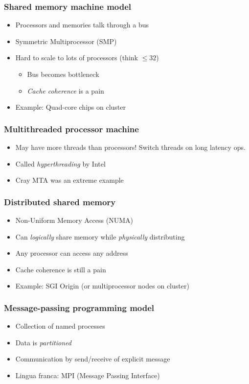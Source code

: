 \documentclass{beamer}
\begin{document}
\begin{frame}
  \frametitle{Shared memory machine model}

  \begin{itemize}
  \item Processors and memories talk through a bus
  \item Symmetric Multiprocessor (SMP)
  \item Hard to scale to lots of processors (think $\leq 32$)
    \begin{itemize}
      \item Bus becomes bottleneck
      \item {\em Cache coherence} is a pain
    \end{itemize}
  \item Example: Quad-core chips on cluster
  \end{itemize}
\end{frame}


\begin{frame}
  \frametitle{Multithreaded processor machine}
  
  \begin{itemize}
  \item May have more threads than processors!
    Switch threads on long latency ops.
  \item Called {\em hyperthreading} by Intel
  \item Cray MTA was an extreme example
  \end{itemize}
\end{frame}


\begin{frame}
  \frametitle{Distributed shared memory}
 
  \begin{itemize}
  \item Non-Uniform Memory Access (NUMA)
  \item Can {\em logically} share memory while {\em physically} distributing
  \item Any processor can access any address
  \item Cache coherence is still a pain
  \item Example: SGI Origin (or multiprocessor nodes on cluster)
  \end{itemize}
\end{frame}


\begin{frame}
  \frametitle{Message-passing programming model}

  \begin{itemize}
  \item Collection of named processes
  \item Data is {\em partitioned}
  \item Communication by send/receive of explicit message
  \item Lingua franca: MPI (Message Passing Interface)
  \end{itemize}
\end{frame}
\end{document}
